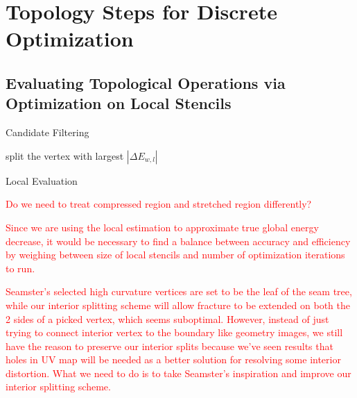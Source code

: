 \section{Topology Steps for Discrete Optimization}

\subsection{Evaluating Topological Operations via Optimization on Local Stencils}

\begin{algorithm}[h]
\SetAlgoLined
{}
\caption{Candidate Filtering}
\end{algorithm}

\begin{algorithm}[h]
\SetAlgoLined
{}
split the vertex with largest $|\Delta E_{w,l}|$
\caption{Local Evaluation}
\end{algorithm}

\textcolor{red}{
Do we need to treat compressed region and stretched region differently?
}

\textcolor{red}{
Since we are using the local estimation to approximate true global energy decrease, it would be necessary to find a balance between accuracy and efficiency by weighing between size of local stencils and number of optimization iterations to run.
}

\textcolor{red}{
Seamster's selected high curvature vertices are set to be the leaf of the seam tree, while our interior splitting scheme will allow fracture to be extended on both the 2 sides of a picked vertex, which seems suboptimal. However, instead of just trying to connect interior vertex to the boundary like geometry images, we still have the reason to preserve our interior splits because we've seen results that holes in UV map will be needed as a better solution for resolving some interior distortion. What we need to do is to take Seamster's inspiration and improve our interior splitting scheme.
}

